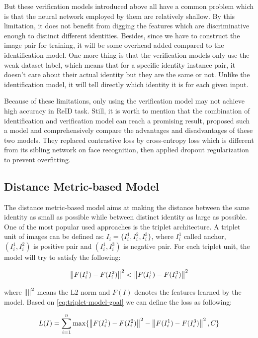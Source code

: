 But these verification models introduced above all have a common problem which is that the neural network employed by them are relatively
shallow. By this limitation, it does not benefit from digging the features which are discriminative enough to distinct different identities.
Besides, since we have to construct the image pair for training, it will be some overhead added compared to the identification model. One more
thing is that the verification models only use the weak dataset label, which means that for a specific identity instance pair, it doesn't
care about their actual identity but they are the same or not. Unlike the identification model, it will tell directly which identity it is for each
given input.

Because of these limitations, only using the verification model may not achieve high accuracy in ReID task. Still, it is worth to mention
that the combination of identification and verification model can reach a promising result,
\cite{id-verif-combined-learned-cnn-embedding-for-reid-2016} proposed such a model and comprehensively compare the advantages and disadvantages
of these two models. They replaced contrastive loss by cross-entropy loss which is different from its sibling network on face recognition, then
applied dropout regularization to prevent overfitting.

\subsection{Distance Metric-based Model}
\label{sec:related-work-re-id-dism}
The distance metric-based model aims at making the distance between the same identity as small as possible while between
distinct identity as large as possible. One of the most popular used approaches is the triplet architecture.
A triplet unit of images can be defined as:
$I_i=\{I_i^1, I_i^2, I_i^3\}$,
where $I_i^1$ called anchor, $(I_i^1, I_i^2)$ is positive pair and $(I_i^1, I_i^3)$ is negative pair.
For each triplet unit, the model will try to satisfy the following:

\begin{equation}
    \label{eq:triplet-model-goal}
    \left\lVert F(I_i^1) - F(I_i^2)\right\rVert ^2 < \left\lVert F(I_i^1) - F(I_i^3)\right\rVert ^2
\end{equation}

where $\left\lVert\right\rVert^2$ means the L2 norm and $F(I)$ denotes the features learned by the model. Based on \autoref{eq:triplet-model-goal}
we can define the loss as following:

\begin{equation}
    \label{eq:common-triplet-loss}
    L(I) = \sum_{i=1}^{n} \max\{ \left\lVert F(I_i^1) - F(I_i^2)\right\rVert ^2 - \left\lVert F(I_i^1) - F(I_i^3)\right\rVert ^2, C \}
\end{equation}

